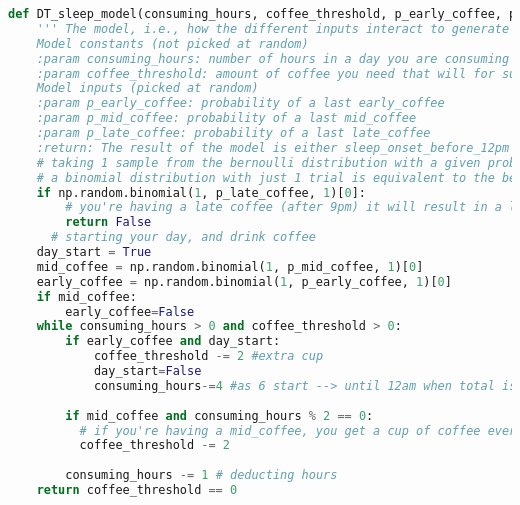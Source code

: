 \documentclass{homework}
\begin{document}
\begin{enumerate}
\begin{enumerate}[label=\alph*)]
\begin{lstlisting}[language=Python, caption=DT MC example 2, basicstyle=\tiny]
def DT_sleep_model(consuming_hours, coffee_threshold, p_early_coffee, p_mid_coffee, p_late_coffee):
    ''' The model, i.e., how the different inputs interact to generate the output
    Model constants (not picked at random)
    :param consuming_hours: number of hours in a day you are consuming coffee (e.g. 5-19 Uhr)
    :param coffee_threshold: amount of coffee you need that will for sure result in a sleep_onset_after 12pm
    Model inputs (picked at random)
    :param p_early_coffee: probability of a last early_coffee
    :param p_mid_coffee: probability of a last mid_coffee
    :param p_late_coffee: probability of a last late_coffee 
    :return: The result of the model is either sleep_onset_before_12pm or sleep_onset_after_12pm.'''
    # taking 1 sample from the bernoulli distribution with a given probability of success.
    # a binomial distribution with just 1 trial is equivalent to the bernoulli distribution. that's done by setting size = 1
    if np.random.binomial(1, p_late_coffee, 1)[0]:
        # you're having a late coffee (after 9pm) it will result in a late sleep anyways
        return False
      # starting your day, and drink coffee
    day_start = True
    mid_coffee = np.random.binomial(1, p_mid_coffee, 1)[0]
    early_coffee = np.random.binomial(1, p_early_coffee, 1)[0]
    if mid_coffee:
        early_coffee=False
    while consuming_hours > 0 and coffee_threshold > 0:
        if early_coffee and day_start:
            coffee_threshold -= 2 #extra cup
            day_start=False
            consuming_hours-=4 #as 6 start --> until 12am when total is 10h consuming time
        
        if mid_coffee and consuming_hours % 2 == 0:
          # if you're having a mid_coffee, you get a cup of coffee every couple of hours
          coffee_threshold -= 2
        
        consuming_hours -= 1 # deducting hours
    return coffee_threshold == 0



\end{lstlisting}
\end{enumerate}
\end{enumerate}
\end{document}
